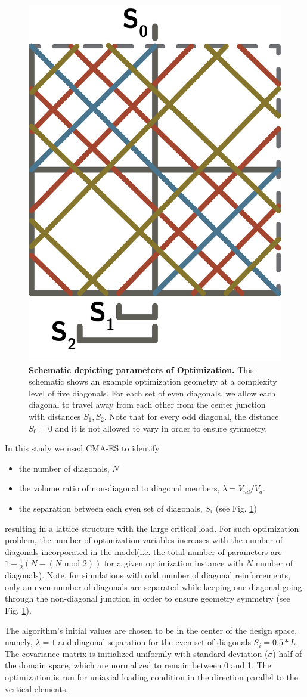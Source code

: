 \documentclass[10pt,twoside]{fernandes_supp}
\begin{document}
\begin{figure}
	\centering
	\includegraphics[width=0.2\linewidth]{SFig11.png}
	\caption{{\bf Schematic depicting parameters of Optimization.} This schematic shows an example optimization geometry  at a complexity level of five diagonals. For each set of even diagonals, we allow each diagonal to travel away from each other from the center junction with distances $S_1,S_2$. Note that for every odd diagonal, the distance $S_0=0$ and it is not allowed to vary in order to ensure symmetry.}
	\label{OptimizationSchematic}
\end{figure}

In this study we used CMA-ES to identify \begin{itemize} 
\item the number of diagonals, $N$
\item the volume ratio  of non-diagonal to diagonal members, $\lambda=V_{nd}/V_{d}$.
\item  the separation between each even set of diagonals, $S_i$ (see Fig. \ref{OptimizationSchematic})
\end{itemize}
resulting in a lattice structure with the large critical load. For such optimization problem, the number of optimization variables increases with the number of diagonals incorporated in the model(i.e. the total number of parameters are $1+ \frac{1}{2}(N - (N \text{ mod } 2))$ for a given optimization instance with $N$ number of diagonals).  Note, for simulations with odd number of diagonal reinforcements, only an even number of diagonals are separated while keeping one diagonal going through the non-diagonal junction in order to ensure geometry symmetry (see Fig. \ref{OptimizationSchematic}). 

The algorithm's initial values are chosen to be in the center of the design space, namely, $\lambda=1$ and diagonal separation for the even set of diagonals $S_i=0.5*L$. The covariance matrix is initialized uniformly with standard deviation ($\sigma$) half of the domain space, which are normalized to remain between 0 and 1. The optimization is run for uniaxial loading condition in the direction parallel to the vertical elements. 
\end{document}
